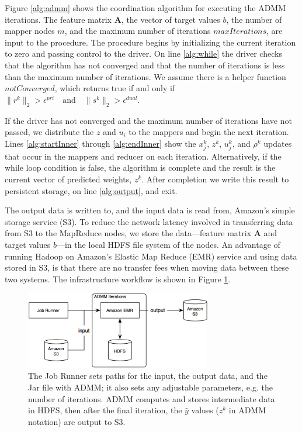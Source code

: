 \documentclass[10pt, conference, compsocconf]{IEEEtran}
\begin{document}
Figure \ref{alg:admm} shows the coordination algorithm for executing the ADMM iterations.  The feature matrix $\mathbf{A}$, the
vector of target values $b$, the number of mapper nodes $m$, and the maximum number of iterations $maxIterations$, are input to the procedure.  The procedure begins by initializing the current iteration to zero and passing control to the driver.  On line \ref{alg:while} the driver checks that the algorithm has not converged and that the number of iterations is less than the maximum number of iterations.  We assume there is a helper function $notConverged$, which returns true if and only if $\|r^k\|_2 > \epsilon^{pri} \quad\text{and}\quad \|s^k\|_2 > \epsilon^{dual}.$

If the driver has not converged and the maximum number of iterations have not passed, we distribute the $z$ and $u_i$ to the mappers and begin the next iteration.  Lines \ref{alg:startInner} through \ref{alg:endInner} show the $x_j^k$, $z^k$, $u_j^k$, and $\rho^k$ updates that occur in the mappers and reducer on each iteration.  Alternatively, if the while loop condition is false, the algorithm is complete and the result is the current vector of predicted weights, $z^k$.  After completion we write this result to persistent storage, on line \ref{alg:output}, and exit.

The output data is written to, and the input data is read from, Amazon's simple storage service (S3). To reduce the network latency involved in transferring data from S3 to the MapReduce nodes, we store the data---feature matrix $\mathbf{A}$ and target values $b$---in the local HDFS file system of the nodes.  An advantage of running Hadoop on Amazon's Elastic Map Reduce (EMR) service and using data stored in S3, is that there are no transfer fees when moving data between these two systems.  The infrastructure workflow is shown in Figure \ref{fig:workflow}.

\begin{figure}[!t]
\centering
\includegraphics[width=3.2in]{aws_implementation}
\caption{The Job Runner sets paths for the input, the output data, and the Jar file with ADMM; it also sets any adjustable parameters, e.g. the number of iterations.  ADMM computes and stores intermediate data in HDFS, then after the final iteration, the $\hat{y}$ values ($z^k$ in ADMM notation) are output to S3.}
\label{fig:workflow}
\end{figure}
\end{document}
